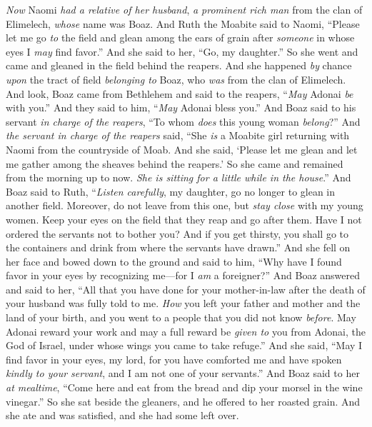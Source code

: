 \begin{biblechapter} %
 \textit{Now} Naomi \textit{had a relative of her husband}, \textit{a prominent rich man} from the clan of Elimelech, \textit{whose} name was Boaz.
\verse And Ruth the Moabite said to Naomi, “Please let me go \textit{to} the field and glean among the ears of grain after \textit{someone} in whose eyes I \textit{may} find favor.” And she said to her, “Go, my daughter.”
\verse So she went and came and gleaned in the field behind the reapers. And she happened \textit{by} chance \textit{upon} the tract of field \textit{belonging to} Boaz, who \textit{was} from the clan of Elimelech.
\verse And look, Boaz came from Bethlehem and said to the reapers, “\textit{May} Adonai \textit{be} with you.” And they said to him, “\textit{May} Adonai bless you.”
\verse And Boaz said to his servant \textit{in charge of the reapers}, “To whom \textit{does} this young woman \textit{belong}?”
\verse And \textit{the servant in charge of the reapers} said, “She \textit{is} a Moabite girl returning with Naomi from the countryside of Moab.
\verse And she said, ‘Please let me glean and let me gather among the sheaves behind the reapers.’ So she came and remained from the morning up to now. \textit{She is sitting for a little while in the house}.”
\verse And Boaz said to Ruth, “\textit{Listen carefully}, my daughter, go no longer to glean in another field. Moreover, do not leave from this one, but \textit{stay close} with my young women.
\verse Keep your eyes on the field that they reap and go after them. Have I not ordered the servants not to bother you? And if you get thirsty, you shall go to the containers and drink from where the servants have drawn.”
\verse And she fell on her face and bowed down to the ground and said to him, “Why have I found favor in your eyes by recognizing me—for I \textit{am} a foreigner?”
\verse And Boaz answered and said to her, “All that you have done for your mother-in-law after the death of your husband was fully told to me. \textit{How} you left your father and mother and the land of your birth, and you went to a people that you did not know \textit{before}.
\verse May Adonai reward your work and may a full reward be \textit{given to} you from Adonai, the God of Israel, under whose wings you came to take refuge.”
\verse And she said, “May I find favor in your eyes, my lord, for you have comforted me and have spoken \textit{kindly to your servant}, and I am not one of your servants.”
\verse And Boaz said to her \textit{at mealtime}, “Come here and eat from the bread and dip your morsel in the wine vinegar.” So she sat beside the gleaners, and he offered to her roasted grain. And she ate and was satisfied, and she had some left over.

\end{biblechapter}
